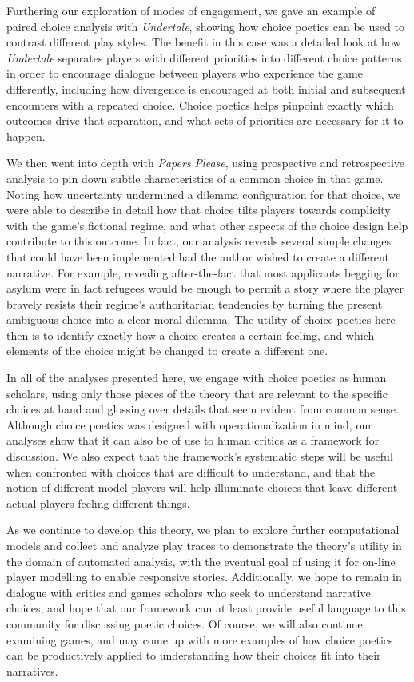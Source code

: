 \documentclass[arts,article,submit,moreauthors,pdftex,10pt,a4paper]{Definitions/mdpi}
\begin{document}
Furthering our exploration of modes of engagement, we gave an example of paired choice analysis with \emph{Undertale}, showing how choice poetics can be used to contrast different play styles.
%
The benefit in this case was a detailed look at how \emph{Undertale} separates players with different priorities into different choice patterns in order to encourage dialogue between players who experience the game differently, including how divergence is encouraged at both initial and subsequent encounters with a repeated choice.
%
Choice poetics helps pinpoint exactly which outcomes drive that separation, and what sets of priorities are necessary for it to happen.


We then went into depth with \emph{Papers Please}, using prospective and retrospective analysis to pin down subtle characteristics of a common choice in that game.
%
Noting how uncertainty undermined a dilemma configuration for that choice, we were able to describe in detail how that choice tilts players towards complicity with the game's fictional regime, and what other aspects of the choice design help contribute to this outcome.
%
In fact, our analysis reveals several simple changes that could have been implemented had the author wished to create a different narrative.
%
For example, revealing after-the-fact that most applicants begging for asylum were in fact refugees would be enough to permit a story where the player bravely resists their regime's authoritarian tendencies by turning the present ambiguous choice into a clear moral dilemma.
%
The utility of choice poetics here then is to identify exactly how a choice creates a certain feeling, and which elements of the choice might be changed to create a different one.


In all of the analyses presented here, we engage with choice poetics as human scholars, using only those pieces of the theory that are relevant to the specific choices at hand and glossing over details that seem evident from common sense.
%
Although choice poetics was designed with operationalization in mind, our analyses show that it can also be of use to human critics as a framework for discussion.
%
We also expect that the framework's systematic steps will be useful when confronted with choices that are difficult to understand, and that the notion of different model players will help illuminate choices that leave different actual players feeling different things.


As we continue to develop this theory, we plan to explore further computational models and collect and analyze play traces to demonstrate the theory's utility in the domain of automated analysis, with the eventual goal of using it for on-line player modelling to enable responsive stories.
%
Additionally, we hope to remain in dialogue with critics and games scholars who seek to understand narrative choices, and hope that our framework can at least provide useful language to this community for discussing poetic choices.
%
Of course, we will also continue examining games, and may come up with more examples of how choice poetics can be productively applied to understanding how their choices fit into their narratives.
\end{document}
